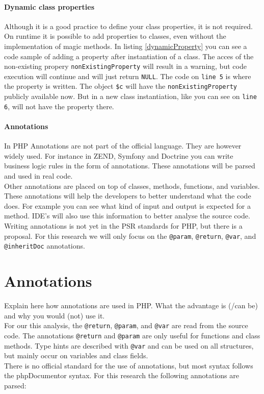 \documentclass[../main.tex]{subfiles}
\begin{document}
    \paragraph{Dynamic class properties}
    Although it is a good practice to define your class properties, it is not required.
    On runtime it is possible to add properties to classes, even without the implementation of magic methods.
    In listing \ref{dynamicProperty} you can see a code sample of adding a property after instantiation of a class.
    The acces of the non-existing propery \texttt{nonExistingProperty} will result in a warning, but code execution will continue and will just return \texttt{NULL}.
    The code on \texttt{line 5} is where the property is written.
    The object \texttt{\$c} will have the \texttt{nonExistingProperty} publicly available now.
    But in a new class instantiation, like you can see on \texttt{line 6}, will not have the property there.
    
    

    \paragraph{Annotations}
    In PHP Annotations are not part of the official language.
    They are however widely used. 
    For instance in ZEND, Symfony and Doctrine you can write business logic rules in the form of annotations.
    These annotations will be parsed and used in real code.
    \\
    Other annotations are placed on top of classes, methods, functions, and variables.
    These annotations will help the developers to better understand what the code does. 
    For example you can see what kind of input and output is expected for a method.
    IDE's will also use this information to better analyse the source code.
    \\
    Writing annotations is not yet in the PSR standards for PHP, but there is a proposal\footnotemark.
    For this research we will only focus on the \texttt{@param}, \texttt{@return}, \texttt{@var}, and \texttt{@inheritDoc} annotations.
    
    \section{Annotations}
    Explain here how annotations are used in PHP. What the advantage is (/can be) and why you would (not) use it.
    \\
    For our this analysis, the \texttt{@return}, \texttt{@param}, and \texttt{@var} are read from the source code.
    The annotations \texttt{@return} and \texttt{@param} are only useful for functions and class methods. Type hints are described with \texttt{@var} and can be used on all structures, but mainly occur on variables and class fields.
    \\
    There is no official standard for the use of annotations, but most syntax follows the phpDocumentor syntax.
    For this research the following annotations are parsed:
    
\end{document}
